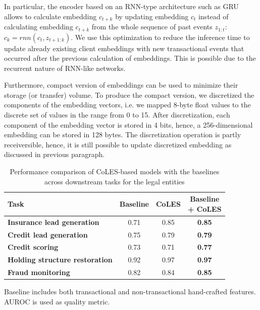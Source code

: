 \documentclass[sigconf, anonymous]{acmart}
\begin{document}
In particular, the encoder based on an RNN-type architecture such as GRU~\citep{Cho2014LearningPR} allows to calculate embedding $c_{t+k}$ by updating embedding $c_t$ instead of calculating embedding $c_{t+k}$ from the whole sequence of past events $z_{1:t}$: $c_k = rnn(c_t, z_{t+1:k})$. We use this optimization to reduce the inference time to update already existing client embeddings with new transactional events that occurred after the previous calculation of embeddings. This is possible due to the recurrent nature of RNN-like networks.

Furthermore, compact version of embeddings can be used to minimize their storage (or transfer) volume. To produce the compact version, we discretized the components of the embedding vectors, i.e. we mapped 8-byte float values to the discrete set of values in the range from 0 to 15. After discretization, each component of the embedding vector is stored in 4 bits, hence, a 256-dimensional embedding can be stored in 128 bytes. The discretization operation is partly receiversible, hence, it is still possible to update discretized embedding as discussed in previous paragraph.

\begin{table}
\centering
\caption{Performance comparison of CoLES-based models with the baselines across downstream tasks for the legal entities}
\begin{tabularx}{\linewidth}{Xccc}
\toprule
\textbf{Task} & \textbf{Baseline } & \textbf{CoLES} & \makecell{\textbf{Baseline} \\ \textbf{+ CoLES}} \\ 
\midrule
\textbf{Insurance lead generation} & 0.71 & 0.85 & \textbf{0.85} \\
\textbf{Credit lead generation} & 0.75 & 0.79 & \textbf{0.79} \\
\textbf{Credit scoring} & 0.73 & 0.71 & \textbf{0.77} \\
\textbf{Holding structure restoration} & 0.92 & 0.97 & \textbf{0.97} \\
\textbf{Fraud monitoring} & 0.82 & 0.84 & \textbf{0.85} \\
\bottomrule
\end{tabularx}
\small{Baseline includes both transactional and non-transactional hand-crafted features. AUROC is used as quality metric.}
\label{tab-internal-company}
\end{table}
\end{document}
